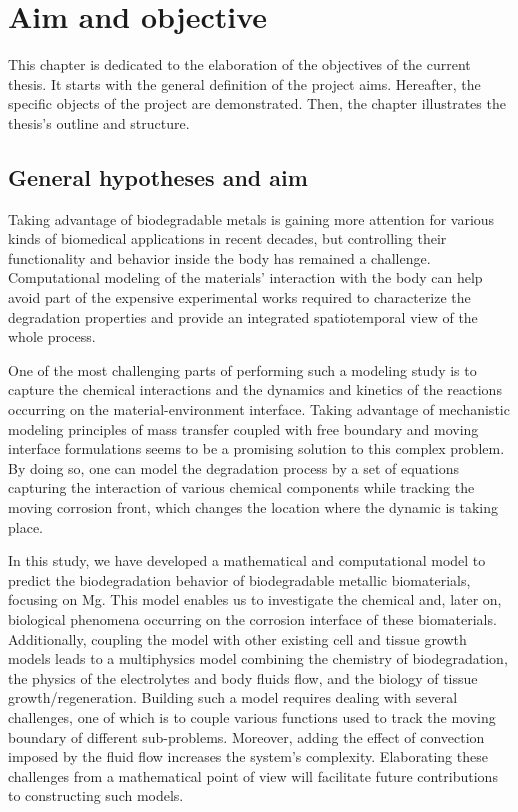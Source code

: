 \chapter{Aim and objective}\label{ch:objective}

This chapter is dedicated to the elaboration of the objectives of the current thesis. It starts with the general definition of the project aims. Hereafter, the specific objects of the project are demonstrated. Then, the chapter illustrates the thesis's outline and structure.


\section{General hypotheses and aim}


Taking advantage of biodegradable metals is gaining more attention for various kinds of biomedical applications in recent decades, but controlling their functionality and behavior inside the body has remained a challenge. Computational modeling of the materials' interaction with the body can help avoid part of the expensive experimental works required to characterize the degradation properties and provide an integrated spatiotemporal view of the whole process.

One of the most challenging parts of performing such a modeling study is to capture the chemical interactions and the dynamics and kinetics of the reactions occurring on the material-environment interface. Taking advantage of mechanistic modeling principles of mass transfer coupled with free boundary and moving interface formulations seems to be a promising solution to this complex problem. By doing so, one can model the degradation process by a set of equations capturing the interaction of various chemical components while tracking the moving corrosion front, which changes the location where the dynamic is taking place.

In this study, we have developed a mathematical and computational model to predict the biodegradation behavior of biodegradable metallic biomaterials, focusing on Mg. This model enables us to investigate the chemical and, later on, biological phenomena occurring on the corrosion interface of these biomaterials. Additionally, coupling the model with other existing cell and tissue growth models leads to a multiphysics model combining the chemistry of biodegradation, the physics of the electrolytes and body fluids flow, and the biology of tissue growth/regeneration. Building such a model requires dealing with several challenges, one of which is to couple various functions used to track the moving boundary of different sub-problems. Moreover, adding the effect of convection imposed by the fluid flow increases the system's complexity. Elaborating these challenges from a mathematical point of view will facilitate future contributions to constructing such models.


